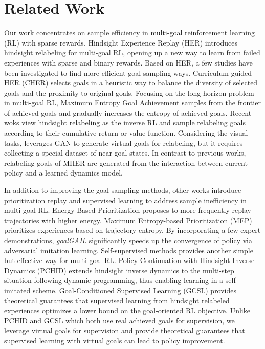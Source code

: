 \documentclass{article}
\begin{document}
\section{Related Work}
Our work concentrates on sample efficiency in multi-goal reinforcement learning (RL) with sparse rewards. Hindsight Experience Replay (HER) \cite{andrychowicz2017hindsight} introduces hindsight relabeling for multi-goal RL, opening up a new way to learn from failed experiences with sparse and binary rewards. Based on HER, a few studies have been investigated to find more efficient goal sampling ways. Curriculum-guided HER (CHER) \cite{fang2019curriculum} selects goals in a heuristic way to balance the diversity of selected goals and the proximity to original goals. Focusing on the long horizon problem in multi-goal RL, Maximum Entropy Goal Achievement \cite{pitis2020maximum} samples from the frontier of achieved goals and gradually increases the entropy of achieved goals. Recent woks \cite{DBLP:conf/nips/LiPA20,DBLP:conf/nips/EysenbachGLS20} view hindsight relabeling as the inverse RL and sample relabeling goals according to their cumulative return or value function. Considering the visual tasks, \cite{DBLP:conf/nips/SahniBAK19} leverages GAN to generate virtual goals for relabeling, but it requires collecting a special dataset of near-goal states. In contrast to previous works, relabeling goals of MHER are generated from the interaction between current policy and a learned dynamics model.

In addition to improving the goal sampling methods, other works introduce prioritization replay and supervised learning to address sample inefficiency in multi-goal RL. Energy-Based Prioritization proposes to more frequently replay trajectories with higher energy. Maximum Entropy-based Prioritization (MEP) \cite{zhao2019maximum} prioritizes experiences based on trajectory entropy. By incorporating a few expert demonstrations, \emph{goalGAIL} \cite{ding2019goal} significantly speeds up the convergence of policy via adversarial imitation learning. Self-supervised methods provides another simple but effective way for multi-goal RL. Policy Continuation with Hindsight Inverse Dynamics (PCHID) \cite{DBLP:conf/nips/SunLLZL19} extends hindsight inverse dynamics to the multi-step situation following dynamic programming, thus enabling learning in a self-imitated scheme. Goal-Conditioned Supervised Learning (GCSL) \cite{ghosh2021learning} provides theoretical guarantees that supervised learning from hindsight relabeled experiences optimizes a lower bound on the goal-oriented RL objective. Unlike PCHID and GCSL which both use real achieved goals for supervision, we leverage virtual goals for supervision and provide theoretical guarantees that supervised learning with virtual goals can lead to policy improvement. 
\end{document}
